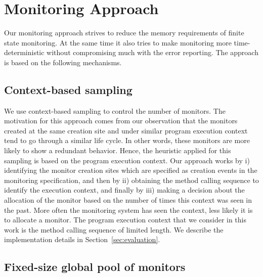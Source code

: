 \section{Monitoring Approach}
\label{sec:approach}

Our monitoring approach strives to reduce the memory requirements of finite 
state monitoring. At the same time it also tries to make monitoring more 
time-deterministic without compromising much with the error reporting.
The approach is based on the following mechanisms.

\subsection{Context-based sampling}

We use context-based sampling to control the 
number of monitors. The motivation for this approach comes from our observation 
that the monitors created at the same creation site and under similar program
execution context tend to go through a similar life cycle. In other words, these monitors are more 
likely to show a redundant behavior. Hence, the heuristic applied for this 
sampling is based on the program execution context. Our approach works by i) identifying 
the monitor creation sites which are specified as creation events in the 
monitoring specification, and then by ii) obtaining the method calling sequence to identify 
the execution context, and finally by iii) making a decision about the 
allocation of the monitor based on the number of times this context was seen in 
the past. More often the monitoring system has seen the context, less likely it 
is to allocate a monitor. The program execution context that we consider in this work is
the method calling sequence of limited length. We describe the implementation details
in Section~\ref{sec:evaluation}.

\subsection{Fixed-size global pool of monitors}

